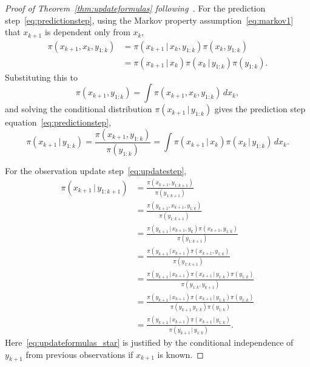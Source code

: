 \begin{proof}[Proof of Theorem~\ref{thm:updateformulas} following~\cite{kaipiosomersalo}]
    For the prediction step~\eqref{eq:predictionstep}, using the Markov property assumption~\eqref{eq:markov1} that $x_{k+1}$ is dependent only from $x_{k}$,
    \begin{align*}
        \pi(x_{k+1}, x_{k}, y_{1:k}) &= \pi(x_{k+1} \, \vert \, x_{k}, y_{1:k}) \pi(x_k, y_{1:k})\\
                                     &= \pi(x_{k+1} \, \vert \, x_{k}) \pi(x_k \, \vert \,  y_{1:k}) \pi(y_{1:k}).
    \end{align*}
    Substituting this to
    \begin{equation*}
        \pi(x_{k+1}, y_{1:k}) = \int \pi(x_{k+1}, x_{k}, y_{1:k}) \, d x_k,
    \end{equation*}
    and solving the conditional distribution $\pi(x_{k+1} \, \vert \, y_{1:k})$ gives the prediction step equation~\eqref{eq:predictionstep},
    \begin{equation*}
        \pi(x_{k+1} \, \vert \, y_{1:k}) = \frac{\pi(x_{k+1}, y_{1:k})}{\pi(y_{1:k})} = \int \pi (x_{k+1} \, \vert \, x_k) \pi (x_k \, \vert \, y_{1:k}) \, d x_k.
    \end{equation*}

    For the observation update step~\eqref{eq:updatestep},
    \begin{align*}
        \pi(x_{k+1} \, \vert \, y_{1:k+1}) &= \frac{\pi(x_{k+1}, y_{1:k+1})}{\pi(y_{1:k+1})}\\
                                           &= \frac{\pi(y_{k+1}, x_{k+1}, y_{1:k})}{\pi(y_{1:k+1})}\\
                                           &= \frac{\pi(y_{k+1} \, \vert \, x_{k+1}, y_{k}) \pi(x_{k+1}, y_{1:k})}{\pi(y_{1:k+1})}\\
                                           &= \frac{\pi(y_{k+1} \, \vert \, x_{k+1}) \pi(x_{k+1}, y_{1:k})}{\pi(y_{1:k+1})} \tag{\textasteriskcentered} \label{eq:updateformulas_star}\\
                                           &= \frac{\pi(y_{k+1} \, \vert \, x_{k+1}) \pi(x_{k+1} \, \vert \,  y_{1:k}) \pi(y_{1:k})}{\pi(y_{1:k}, y_{k+1})}\\
                                           &= \frac{\pi(y_{k+1} \, \vert \, x_{k+1}) \pi(x_{k+1} \, \vert \,  y_{1:k}) \pi(y_{1:k})}{\pi(y_{k+1} \, y_{1:k}) \pi(y_{1:k})}\\
                                           &= \frac{\pi(y_{k+1} \, \vert \, x_{k+1}) \pi(x_{k+1} \, \vert \,  y_{1:k})}{\pi (y_{k+1} \, \vert \, y_{1:k})}.
    \end{align*}
    Here~\eqref{eq:updateformulas_star} is justified by the conditional independence of $y_{k+1}$ from previous observations if $x_{k+1}$ is known.
\end{proof}
